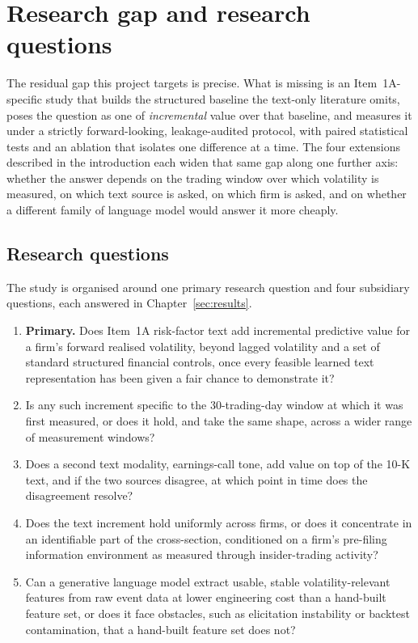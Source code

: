 \documentclass[logo,msc,ai]{infthesis}        %
\begin{document}
\section{Research gap and research questions}
\label{sec:gap}
The residual gap this project targets is precise. What is missing is an Item~1A-specific study that builds the structured baseline the text-only literature omits, poses the question as one of \emph{incremental} value over that baseline, and measures it under a strictly forward-looking, leakage-audited protocol, with paired statistical tests and an ablation that isolates one difference at a time. The four extensions described in the introduction each widen that same gap along one further axis: whether the answer depends on the trading window over which volatility is measured, on which text source is asked, on which firm is asked, and on whether a different family of language model would answer it more cheaply.

\subsection{Research questions}
The study is organised around one primary research question and four subsidiary questions, each answered in Chapter~\ref{sec:results}.

\begin{enumerate}
\item \textbf{Primary.} Does Item~1A risk-factor text add incremental predictive value for a firm's forward realised volatility, beyond lagged volatility and a set of standard structured financial controls, once every feasible learned text representation has been given a fair chance to demonstrate it?
\item Is any such increment specific to the 30-trading-day window at which it was first measured, or does it hold, and take the same shape, across a wider range of measurement windows?
\item Does a second text modality, earnings-call tone, add value on top of the 10-K text, and if the two sources disagree, at which point in time does the disagreement resolve?
\item Does the text increment hold uniformly across firms, or does it concentrate in an identifiable part of the cross-section, conditioned on a firm's pre-filing information environment as measured through insider-trading activity?
\item Can a generative language model extract usable, stable volatility-relevant features from raw event data at lower engineering cost than a hand-built feature set, or does it face obstacles, such as elicitation instability or backtest contamination, that a hand-built feature set does not?
\end{enumerate}
\end{document}
